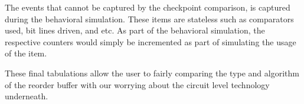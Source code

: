 The events that cannot be captured by the checkpoint comparison, is captured during the behavioral simulation.  These items are stateless such as comparators used, bit lines driven, and etc.
As part of the behavioral simulation, the respective counters would simply be incremented as part of simulating the usage of the item.

These final tabulations allow the user to fairly comparing the type and algorithm of the reorder buffer with our worrying about the circuit level technology underneath.





























